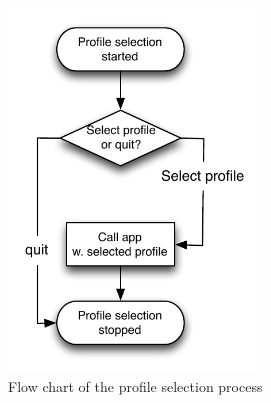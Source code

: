 \label{design:profile_selection}
\begin{figure}[h]
	\centering
	\includegraphics[width=0.6\textwidth]{gfx/profileselect_design.pdf}
	\caption{Flow chart of the profile selection process}
	\label{fig:profileselection_design}
\end{figure}

